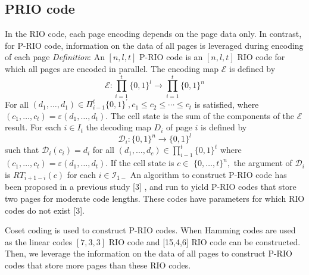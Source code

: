 \documentclass{article}
\begin{document}
\subsection{PRIO code}
In the RIO code, each page encoding depends on the page data only. In contrast, for P-RIO code, information on the data of all pages is leveraged during encoding of each page 
\textit{Definition}: An $[n, l, t]$ P-RIO code is an $[n, l, t]$ RIO code for which all pages are encoded in parallel. The encoding map $\mathcal{E}$ is defined by
$$\mathcal{E}: \prod_{i=1}^{t}\{0,1\}^{l} \rightarrow \prod_{i=1}^{t}\{0,1\}^{n}$$
For all $\left(d_{1}, \ldots, d_{1}\right) \in \Pi_{i-1}^{t}\{0,1\}^{\prime}, c_{1} \leq c_{2} \leq \cdots \leq c_{t}$ is
satisfied, where $\left(c_{1}, \ldots, c_{t}\right)=\varepsilon\left(d_{1}, \ldots, d_{t}\right) .$ The cell state is the sum of the components of the $\mathcal{E}$ result. For each $i \in I_{t}$ the decoding map $D_{i}$ of page $i$ is defined by
$$
\mathcal{D}_{i}:\{0,1\}^{n} \rightarrow\{0,1\}^{l}
$$
such that $\mathcal{D}_{i}\left(c_{i}\right)=d_{i}$ for all $\left(d_{1}, \ldots, d_{c}\right) \in \prod_{i-1}^{t}\{0,1\}^{t}$
where $\left(c_{1}, \ldots, c_{t}\right)=\varepsilon\left(d_{1}, \ldots, d_{t}\right) .$ If the cell state is $c \in$
$\{0, \ldots, t\}^{n},$ the argument of $\mathcal{D}_{i}$ is $R T_{i+1-i}(c)$ for each $i \in \mathcal{I}_{1-}$
An algorithm to construct P-RIO code has been proposed in a previous study [3] , and run to yicld P-RIO codes that store two pages for moderate code lengths. These codes have parameters for which RIO codes do not exist [3].

 Coset coding is used  to construct P-RIO codes. When Hamming codes are used as the linear codes $[7,3,3]$ RIO code and [15,4,6] RIO code can be constructed. Then, we leverage the information on the data of all pages to construct P-RIO codes that store more pages than these $\mathrm{RIO}$ codes.
\end{document}
